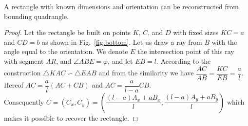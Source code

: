 \documentclass[graybox]{svmult}
\begin{document}
\begin{proposition} \label{prop:orient}
A rectangle with known dimensions and orientation can be reconstructed from bounding quadrangle.
\end{proposition}
\begin{proof}
Let the rectangle be built on points $K$, $C$, and $D$ with fixed sizes $KC = a$ and $CD = b$ as shown in Fig.~\ref{fig:bottom}.
Let us draw a ray from $B$ with the angle equal to the orientation. We denote $E$ the intersection point of this ray with segment $AR$,  and $\angle ABE = \varphi$, and let $EB = l$. According to the construction  $\triangle K A C \backsim  \triangle E A B$ and 
from the similarity we have 
$\dfrac{AC}{AB} = \dfrac{KC}{EB} = \dfrac{a}{l}$.\\
Hereof $AC = \dfrac{a}{l} (AC + CB)$ and $AC  = \dfrac{a}{l-a} CB$.\\
Consequently $C= (C_x, C_y) = \left(\dfrac{(l - a) A_x + a  B_x}{l}, \dfrac{(l - a) A_y + a B_y}{l}\right)$ which makes it possible to recover the rectangle. 

\end{proof}
\end{document}
